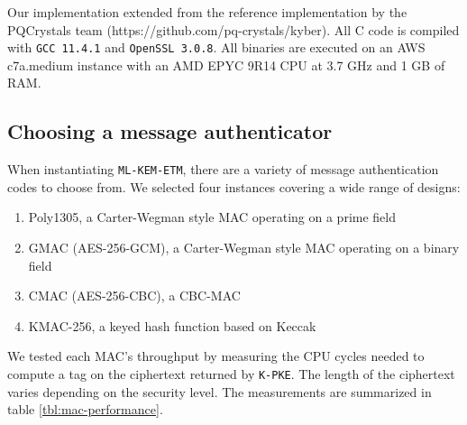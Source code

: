 \documentclass[floatrow,journal=tches,submission]{iacrtrans}
\begin{document}
Our implementation extended from the reference implementation by the PQCrystals team (https://github.com/pq-crystals/kyber). All C code is compiled with \texttt{GCC 11.4.1} and \texttt{OpenSSL 3.0.8}. All binaries are executed on an AWS c7a.medium instance with an AMD EPYC 9R14 CPU at 3.7 GHz and 1 GB of RAM.

\subsection{Choosing a message authenticator}
When instantiating \texttt{ML-KEM-ETM}, there are a variety of message authentication codes to choose from. We selected four instances covering a wide range of designs: \begin{enumerate}
    \item Poly1305, a Carter-Wegman style MAC operating on a prime field
    \item GMAC (AES-256-GCM), a Carter-Wegman style MAC operating on a binary field
    \item CMAC (AES-256-CBC), a CBC-MAC
    \item KMAC-256, a keyed hash function based on Keccak
\end{enumerate}

We tested each MAC's throughput by measuring the CPU cycles needed to compute a tag on the ciphertext returned by \texttt{K-PKE}. The length of the ciphertext varies depending on the security level. The measurements are summarized in table \ref{tbl:mac-performance}.
\end{document}
